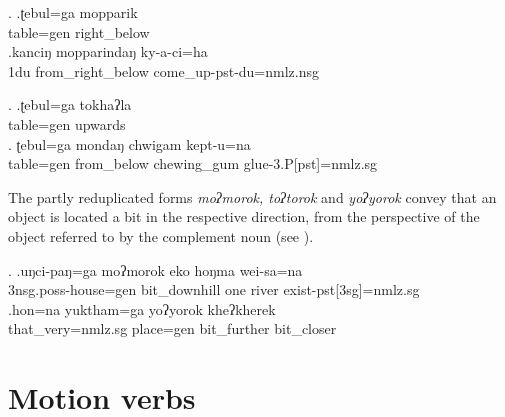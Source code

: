 \ex. \ag.ʈebul=ga mopparik\\
table{\sc =gen} right\_below\\
\bg.kanciŋ mopparindaŋ ky-a-ci=ha\\
{\sc 1du} from\_right\_below come\_up{\sc -pst-du=nmlz.nsg}\\

\ex. \ag.ʈebul=ga tokhaʔla\\
table{\sc =gen} upwards\\
\bg. ʈebul=ga mondaŋ chwigam kept-u=na\\
table{\sc =gen} from\_below chewing\_gum  glue{\sc -3.P[pst]=nmlz.sg}\\

The partly reduplicated forms \emph{moʔmorok, toʔtorok} and \emph{yoʔyorok} convey that an object is located a bit in the respective direction, from the perspective of the object referred to by the complement noun (see \Next).

\ex. \ag.uŋci-paŋ=ga           moʔmorok          eko hoŋma wei-sa=na\\
{\sc 3nsg.poss-}house{\sc =gen}  bit\_downhill one river exist{\sc -pst[3sg]=nmlz.sg}\\
 
\bg.hon=na         yuktham=ga    yoʔyorok     kheʔkherek\\
that\_very{\sc =nmlz.sg} place{\sc =gen} bit\_further bit\_closer\\
 
		
		

\section{Motion verbs}\label{geomorph-verb}

